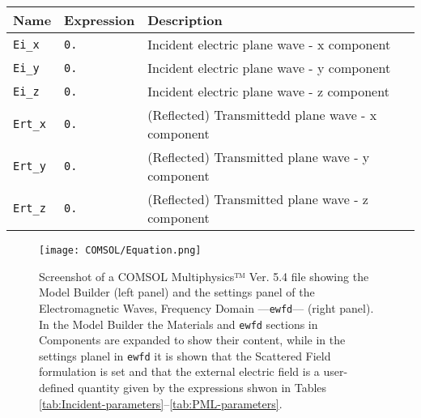 \begin{sidewaystable}
\begin{tabular*}{.9606\textwidth}{ |l|l|l| }
     \hline \hline
    \end{tabular*}
 \vspace*{1.5em}
 \caption{Local definitions for COMSOL simulation: Component/Definitions/Variables. The below variables are locally defined in the subvolume  \lstinline!PML Domain!.  }
 \label{tab:PML-parameters}
     \begin{tabular*}{.501\textwidth}{ |l|l|l| }
     \hline
     \textbf{Name}          &   \textbf{Expression}              &   \textbf{Description} \\ \hline \hline
     \lstinline!Ei_x!       &   \lstinline!0.!                   &   Incident electric plane wave - x component \\
     \lstinline!Ei_y!       &   \lstinline!0.!                   &   Incident electric plane wave - y component \\
     \lstinline!Ei_z!       &   \lstinline!0.!                   &   Incident electric plane wave - z component \\
     \lstinline!Ert_x!      &   \lstinline!0.!                   &   (Reflected) Transmittedd plane wave - x component \\
     \lstinline!Ert_y!      &   \lstinline!0.!                   &   (Reflected) Transmitted plane wave - y component  \\
     \lstinline!Ert_z!      &   \lstinline!0.!                   &   (Reflected) Transmitted plane wave - z component \\
     \hline \hline
    \end{tabular*}
\end{sidewaystable}

\begin{figure}[h!]
    \centering
\texttt{[image: COMSOL/Equation.png]}
\caption[COMSOl File Screenshot: Components/Material and Components/ewfd]{Screenshot of a COMSOL Multiphysics™ Ver. 5.4 file showing the Model Builder (left panel) and the settings panel of the Electromagnetic Waves, Frequency Domain ---\lstinline!ewfd!--- (right panel). In the Model Builder the Materials and \lstinline!ewfd! sections in Components are expanded to show their content, while in the settings planel in \lstinline!ewfd! it is shown that the Scattered Field formulation is set and that the external electric field is a user-defined quantity given by the expressions shwon in Tables \ref{tab:Incident-parameters}--\ref{tab:PML-parameters}.}
\label{fig:COMSOL-Eq}
\end{figure}



